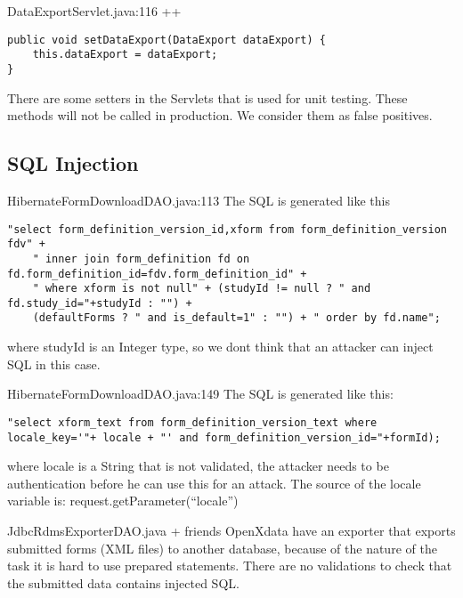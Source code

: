 \documentclass[11pt,a4paper]{article}
\theoremstyle{definition}
\begin{document}
DataExportServlet.java:116 ++
\begin{lstlisting}
public void setDataExport(DataExport dataExport) {
    this.dataExport = dataExport;
}
\end{lstlisting}
There are some setters in the Servlets that is used for unit testing. These methods will not be called in production.
We consider them as false positives.

\subsection{SQL Injection}
HibernateFormDownloadDAO.java:113
The SQL is generated like this
\begin{lstlisting}
"select form_definition_version_id,xform from form_definition_version fdv" +
    " inner join form_definition fd on fd.form_definition_id=fdv.form_definition_id" +
    " where xform is not null" + (studyId != null ? " and fd.study_id="+studyId : "") +
    (defaultForms ? " and is_default=1" : "") + " order by fd.name";
\end{lstlisting}
where studyId is an Integer type, so we dont think that an attacker can inject SQL in this case.


HibernateFormDownloadDAO.java:149
The SQL is generated like this:
\begin{lstlisting}
"select xform_text from form_definition_version_text where locale_key='"+ locale + "' and form_definition_version_id="+formId);
\end{lstlisting}
where locale is a String that is not validated, the attacker needs to be authentication before he can use this for an attack.
The source of the locale variable is: request.getParameter(``locale'')


JdbcRdmsExporterDAO.java + friends
OpenXdata have an exporter that exports submitted forms (XML files) to another database, because of the nature of the task it is hard to use prepared statements.
There are no validations to check that the submitted data contains injected SQL.
\end{document}

